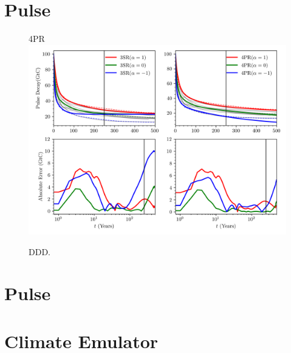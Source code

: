 \documentclass[11pt, a4paper, pdftex, twoside, dvipsnames]{article}
\begin{document}
 
 
 
 \section{Pulse}
 
\begin{figure}[b]
    \centering
	 \raggedright{\hspace{18em}\small{\textsc{4PR}}} 
    \includegraphics[width=\textwidth]{fig/plot_pulse_decay.png}
    \caption{
    DDD.
     }
    \label{fig:6}
\end{figure}
%


 
 
 \section{Pulse}
 
 
 
 


 

 

 
 

 
 
 
 












\clearpage
\newpage
\appendix
\section{Climate Emulator}
\setcounter{figure}{0}                       %
\renewcommand\thefigure{A.\arabic{figure}}   %
\end{document}

